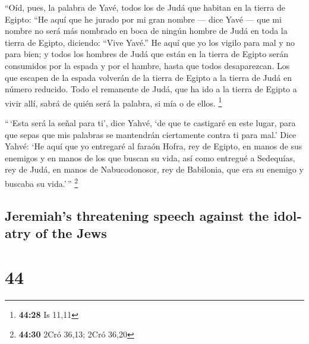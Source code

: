 \begin{paracol}{2}
 ``Oíd, pues, la palabra de Yavé, todos los de Judá que
habitan en la tierra de Egipto: ``He aquí que he jurado por mi gran
nombre --- dice Yavé --- que mi nombre no será más nombrado en boca de
ningún hombre de Judá en toda la tierra de Egipto, diciendo: ``Vive
Yavé.''  He aquí que yo los vigilo para mal y no para
bien; y todos los hombres de Judá que están en la tierra de Egipto serán
consumidos por la espada y por el hambre, hasta que todos desaparezcan.
 Los que escapen de la espada volverán de la tierra de
Egipto a la tierra de Judá en número reducido. Todo el remanente de
Judá, que ha ido a la tierra de Egipto a vivir allí, sabrá de quién será
la palabra, si mía o de ellos. \footnote{\textbf{44:28} Is 11,11}

 ``\,`Esta será la señal para ti', dice Yahvé, `de que te
castigaré en este lugar, para que sepas que mis palabras se mantendrán
ciertamente contra ti para mal.'  Dice Yahvé: `He aquí
que yo entregaré al faraón Hofra, rey de Egipto, en manos de sus
enemigos y en manos de los que buscan su vida, así como entregué a
Sedequías, rey de Judá, en manos de Nabucodonosor, rey de Babilonia, que
era su enemigo y buscaba su vida.'\,'' \footnote{\textbf{44:30} 2Cró
  36,13; 2Cró 36,20}

\switchcolumn
\begin{otherlanguage}{english}

\hypertarget{jeremiahs-threatening-speech-against-the-idolatry-of-the-jews}{%
\subsection{Jeremiah's threatening speech against the idolatry of the
Jews}\label{jeremiahs-threatening-speech-against-the-idolatry-of-the-jews}}

\hypertarget{section-87}{%
\section{44}\label{section-87}}


\end{otherlanguage}
\end{paracol}
